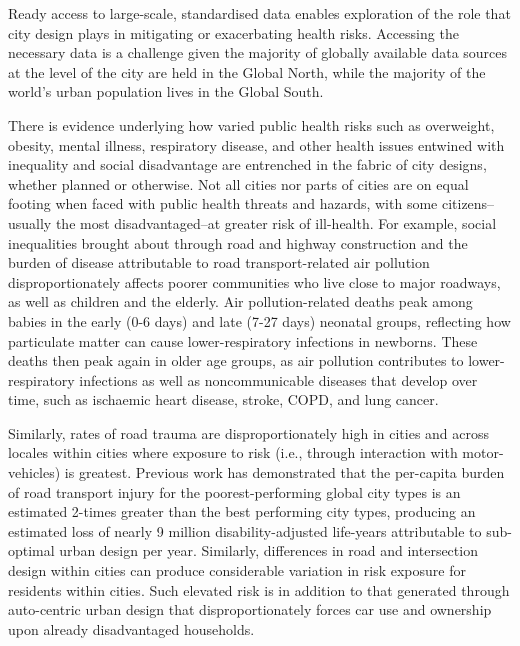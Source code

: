 \documentclass[preprint,12pt]{elsarticle}
\begin{document}
Ready access to large-scale, standardised data enables exploration of the role that city design plays in mitigating or exacerbating health risks. Accessing the necessary data is a challenge given the majority of globally available data sources at the level of the city are held in the Global North, while the majority of the world's urban population lives in the Global South\cite{Smit2021}.

There is evidence underlying  how varied public health risks such as  overweight, obesity, mental illness, respiratory disease, and other health issues entwined with inequality and social disadvantage are entrenched in the fabric of city designs, whether planned or otherwise\cite{borrell2013factors,xing2016impact,yuchi2020road}. Not all cities nor parts of cities are on equal footing when faced with public health threats and hazards, with some citizens--usually the most disadvantaged--at greater risk of ill-health\cite{KRISHNA2021102046}. For example, social inequalities brought about through road and highway construction\cite{carpenter2010poverty,archer2020white} and the burden of disease attributable to road transport-related air pollution disproportionately affects poorer communities who live close to major roadways, as well as children and the elderly. Air pollution-related deaths peak among babies in the early (0-6 days) and late (7-27 days) neonatal groups, reflecting how particulate matter can cause lower-respiratory infections in newborns. These deaths then peak again in older age groups, as air pollution contributes to lower-respiratory infections as well as noncommunicable diseases that develop over time, such as ischaemic heart disease, stroke, COPD, and lung cancer\cite{boogaard2022long}. 

Similarly, rates of road trauma are disproportionately high in cities and across locales within  cities where exposure to risk (i.e., through interaction with motor-vehicles) is greatest. Previous work has demonstrated that the per-capita burden of road transport injury for the poorest-performing global city types is an estimated 2-times greater than the best performing city types, producing an estimated loss of nearly 9 million disability-adjusted life-years attributable to sub-optimal urban design per year\cite{Thompson2020}. Similarly, differences in road and intersection design within cities can produce considerable variation in risk exposure for residents within cities\cite{Wijnands_IntersectionDesign2021,MORRISON2019123}. Such elevated risk is in addition to that generated through auto-centric urban design that disproportionately forces car use and ownership upon already disadvantaged households\cite{currie2018alarming, CURL201861}. 
\end{document}
